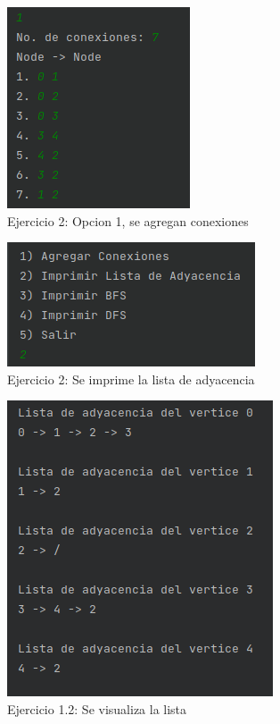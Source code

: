 \documentclass{article}
\begin{document}
			\begin{figure}[H]
				\centering
				\includegraphics[scale= 1]{images/e23.png}
				\caption*{Ejercicio 2: Opcion 1, se agregan conexiones}
			\end{figure}
			
			\begin{figure}[H]
				\centering
				\includegraphics[scale= 1]{images/e24.png}
				\caption*{Ejercicio 2: Se imprime la lista de adyacencia}
			\end{figure}
			
			\begin{figure}[H]
				\centering
				\includegraphics[scale= 1]{images/e25.png}
				\caption*{Ejercicio 1.2: Se visualiza la lista}
			\end{figure}
		
\end{document}
